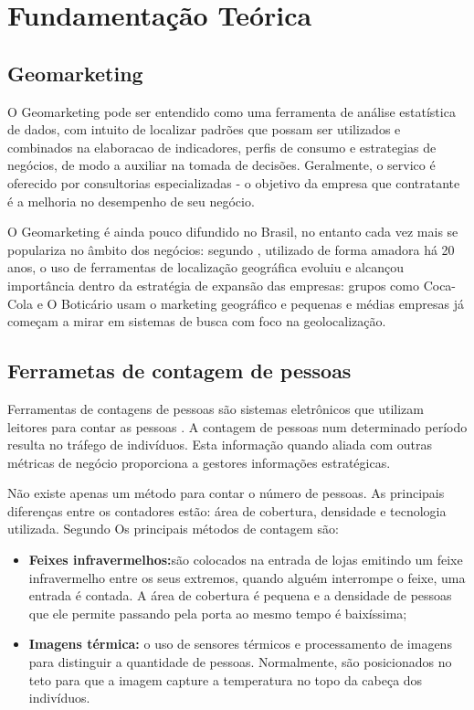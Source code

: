 
\chapter{Fundamentação Teórica}
\label{fundamentacao-teorica}

\section{Geomarketing}
O Geomarketing pode ser entendido como uma ferramenta de análise estatística de dados, com intuito de localizar padrões que possam ser utilizados e combinados na elaboracao de indicadores, perfis de consumo e estrategias de negócios, de modo a auxiliar na tomada de decisões. Geralmente, o servico é oferecido por consultorias especializadas - o  objetivo da empresa que contratante é a melhoria no desempenho de seu negócio.

O Geomarketing é ainda pouco difundido no Brasil, no entanto cada vez mais se populariza no âmbito dos negócios: segundo \cite{Exame}, utilizado de forma amadora há 20 anos, o uso de ferramentas de localização geográfica evoluiu e alcançou importância dentro da estratégia de expansão das empresas: grupos como Coca-Cola e O Boticário usam o marketing geográfico e pequenas e médias empresas já começam a mirar em sistemas de busca com foco na geolocalização.

\section{Ferrametas de contagem de pessoas}
Ferramentas de contagens de pessoas são sistemas eletrônicos que utilizam leitores para contar as pessoas \cite{trafsysdef}. A contagem de pessoas
num determinado período resulta no tráfego de indivíduos. Esta informação quando aliada com outras métricas de negócio proporciona a gestores
informações estratégicas.

Não existe apenas um método para contar o número de pessoas. As principais diferenças entre os contadores estão: área de cobertura, densidade e tecnologia utilizada. Segundo Os principais
métodos de contagem são:
\begin{itemize}
  \item \textbf{Feixes infravermelhos:}são colocados na entrada de lojas emitindo um feixe infravermelho entre os seus extremos, quando
  alguém interrompe o feixe, uma entrada é contada. A área de cobertura é pequena e a densidade de pessoas que ele permite passando pela porta
  ao mesmo tempo é baixíssima;
  \item \textbf{Imagens térmica:} o uso de sensores térmicos e processamento de imagens para distinguir a quantidade de pessoas. Normalmente, são
  posicionados no teto para que a imagem capture a temperatura no topo da cabeça dos indivíduos.
\end{itemize}




